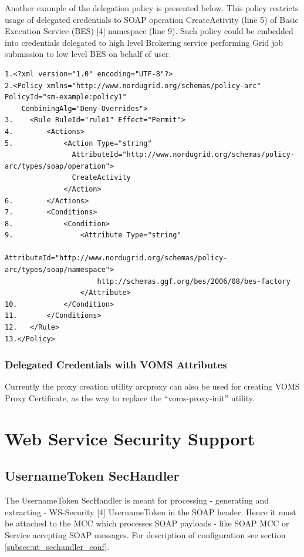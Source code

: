 \documentclass{article}                            %
\begin{document}
Another example of the delegation policy is presented below. This policy restricts usage of delegated credentials to SOAP operation CreateActivity (line 5) of Basic Execution Service (BES) [4] namespace (line 9). Such policy could be embedded into credentials delegated to high level Brokering service performing Grid job submission to low level BES on behalf of user.

\begin{verbatim}
1.<?xml version="1.0" encoding="UTF-8"?>
2.<Policy xmlns="http://www.nordugrid.org/schemas/policy-arc" PolicyId="sm-example:policy1" 
    CombiningAlg="Deny-Overrides">
3.    <Rule RuleId="rule1" Effect="Permit">
4.        <Actions>
5.            <Action Type="string" 
                AttributeId="http://www.nordugrid.org/schemas/policy-arc/types/soap/operation">
                CreateActivity
              </Action>
6.        </Actions>
7.        <Conditions>
8.            <Condition>
9.                <Attribute Type="string" 
                      AttributeId="http://www.nordugrid.org/schemas/policy-arc/types/soap/namespace">
                      http://schemas.ggf.org/bes/2006/08/bes-factory
                  </Attribute>
10.           </Condition>
11.       </Conditions>
12.   </Rule>
13.</Policy>
\end{verbatim}

\subsubsection{Delegated Credentials with VOMS Attributes} %
\label{subsec:delegation_voms}
Currently the proxy creation utility arcproxy can also be used for creating VOMS Proxy Certificate, as the way to replace the ``voms-proxy-init'' utility.






\section{Web Service Security Support} %
\label{sec:webservice}

\subsection{UsernameToken SecHandler} %
\label{subsec:username_token}
The UsernameToken SecHandler is meant for processing - generating and extracting - WS-Security [4] UsernameToken in the SOAP header. Hence it must be attached to the MCC which processes SOAP payloads - like SOAP MCC or Service accepting SOAP messages. For description of configuration see section \ref{subsec:ut_sechandler_conf}.
\end{document}

